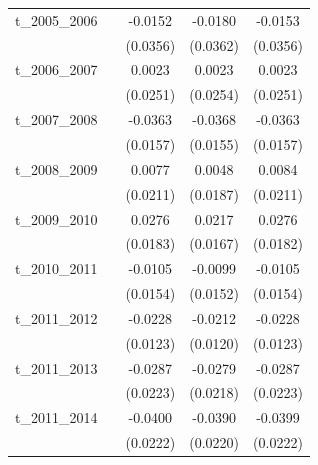 \begin{table}[htbp]
\begin{tabular}{l*{4}{c}}
t\_2005\_2006 &                     &     -0.0152         &     -0.0180         &     -0.0153         \\
            &                     &    (0.0356)         &    (0.0362)         &    (0.0356)         \\
[1em]
t\_2006\_2007 &                     &      0.0023         &      0.0023         &      0.0023         \\
            &                     &    (0.0251)         &    (0.0254)         &    (0.0251)         \\
[1em]
t\_2007\_2008 &                     &     -0.0363\sym{**} &     -0.0368\sym{**} &     -0.0363\sym{**} \\
            &                     &    (0.0157)         &    (0.0155)         &    (0.0157)         \\
[1em]
t\_2008\_2009 &                     &      0.0077         &      0.0048         &      0.0084         \\
            &                     &    (0.0211)         &    (0.0187)         &    (0.0211)         \\
[1em]
t\_2009\_2010 &                     &      0.0276         &      0.0217         &      0.0276         \\
            &                     &    (0.0183)         &    (0.0167)         &    (0.0182)         \\
[1em]
t\_2010\_2011 &                     &     -0.0105         &     -0.0099         &     -0.0105         \\
            &                     &    (0.0154)         &    (0.0152)         &    (0.0154)         \\
[1em]
t\_2011\_2012 &                     &     -0.0228\sym{*}  &     -0.0212\sym{*}  &     -0.0228\sym{*}  \\
            &                     &    (0.0123)         &    (0.0120)         &    (0.0123)         \\
[1em]
t\_2011\_2013 &                     &     -0.0287         &     -0.0279         &     -0.0287         \\
            &                     &    (0.0223)         &    (0.0218)         &    (0.0223)         \\
[1em]
t\_2011\_2014 &                     &     -0.0400\sym{*}  &     -0.0390\sym{*}  &     -0.0399\sym{*}  \\
            &                     &    (0.0222)         &    (0.0220)         &    (0.0222)         \\

\end{tabular}
\end{table}
